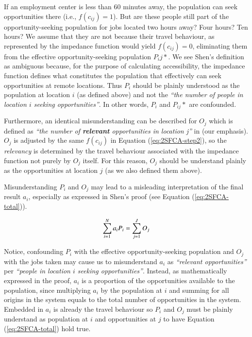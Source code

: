 \documentclass[]{elsarticle} %
\begin{document}
If an employment center is less than 60 minutes away, the population can
seek opportunities there (i.e., \(f(c_{ij})=1\)). But are these people
still part of the opportunity-seeking population for jobs located two
hours away? Four hours? Ten hours? We assume that they are not because
their travel behaviour, as represented by the impedance function would
yield \(f(c_{ij})=0\), eliminating them from the effective
opportunity-seeking population \(P_ij*\). We see Shen's definition as
ambiguous because, for the purpose of calculating accessibility, the
impedance function defines what constitutes the population that
effectively can seek opportunities at remote locations. Thus \(P_i\)
should be plainly understood as the population at location \(i\) (as
defined above) and not the \emph{``the number of people in location
\(i\) seeking opportunities''}. In other words, \(P_i\) and \(P_{ij}*\)
are confounded.

Furthermore, an identical misunderstanding can be described for \(O_j\)
which is defined as \emph{``the number of \textbf{relevant}
opportunities in location j''} in \citet{shen1998} (our emphasis).
\(O_j\) is adjusted by the same \(f(c_{ij})\) in Equation
(\ref{eq:2SFCA-step2}), so the \emph{relevancy} is determined by the
travel behaviour associated with the impedance function not purely by
\(O_j\) itself. For this reason, \(O_j\) should be understand plainly as
the opportunities at location \(j\) (as we also defined them above).

Misunderstanding \(P_i\) and \(O_j\) may lead to a misleading
interpretation of the final result \(a_i\), especially as expressed in
Shen's proof (see Equation (\ref{eq:2SFCA-total})).

\begin{equation}
\label{eq:2SFCA-total}
\sum_{i=1}^N a_{i} P_i= \sum_{j=1}^JO_j\\
\end{equation}

Notice, confounding \(P_i\) with the effective opportunity-seeking
population and \(O_j\) with the jobs taken may cause us to misunderstand
\(a_{i}\) as \emph{``relevant opportunities''} per \emph{``people in
location \(i\) seeking opportunities''}. Instead, as mathematically
expressed in the proof, \(a_{i}\) is a proportion of the opportunities
available to the population, since multiplying \(a_i\) by the population
at \(i\) and summing for all origins in the system equals to the total
number of opportunities in the system. Embedded in \(a_i\) is already
the travel behaviour so \(P_i\) and \(O_j\) must be plainly understand
as population at \(i\) and opportunities at \(j\) to have Equation
(\ref{eq:2SFCA-total}) hold true.
\end{document}
